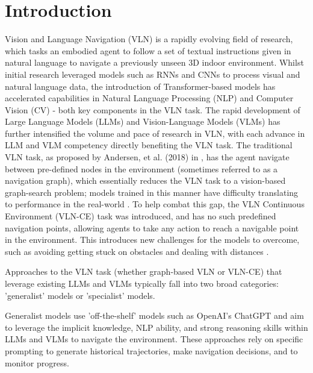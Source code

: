 \documentclass{svproc}
\begin{document}
\section{Introduction}
    Vision and Language Navigation (VLN) is a rapidly evolving field of research, which tasks an embodied agent to follow a set of textual instructions given in natural language to navigate a previously unseen 3D indoor environment. Whilst initial research leveraged models such as RNNs and CNNs to process visual and natural language data, the introduction of Transformer-based models \cite{attenion_is_all_you_need} has accelerated capabilities in Natural Language Processing (NLP) and Computer Vision (CV) - both key components in the VLN task. The rapid development of Large Language Models (LLMs) and Vision-Language Models (VLMs) has further intensified the volume and pace of research in VLN, with each advance in LLM and VLM competency directly benefiting the VLN task.
    The traditional VLN task, as proposed by Andersen, et al. (2018) in \cite{8578485}, has the agent navigate between pre-defined nodes in the environment (sometimes referred to as a navigation graph), which essentially reduces the VLN task to a vision-based graph-search problem; models trained in this manner have difficulty translating to performance in the real-world \cite{pmlr-v155-anderson21a}. To help combat this gap, the VLN Continuous Environment (VLN-CE) task was introduced, and has no such predefined navigation points, allowing agents to take any action to reach a navigable point in the environment. This introduces new challenges for the models to overcome, such as avoiding getting stuck on obstacles and dealing with distances \cite{krantz2020navgraphvisionandlanguagenavigationcontinuous}.
    \newline \par
    Approaches to the VLN task (whether graph-based VLN or VLN-CE) that leverage existing LLMs and VLMs typically fall into two broad categories: 'generalist' models or 'specialist' models.
    \par
    Generalist models \cite{long2023_discussnav, chen2024mapgptmapguidedpromptingadaptive, zhou2023navgptexplicitreasoningvisionandlanguage} use 'off-the-shelf' models such as OpenAI's ChatGPT \cite{CITATION_REQUIRED} and aim to leverage the implicit knowledge, NLP ability, and strong reasoning skills within LLMs and VLMs \cite{51647, LMs_as_knowledge_bases} to navigate the environment. These approaches rely on specific prompting to generate historical trajectories, make navigation decisions, and to monitor progress.
\end{document}
